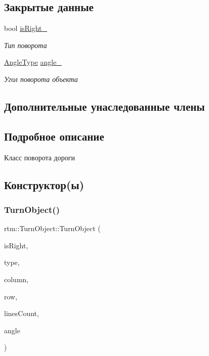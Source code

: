 \subsection*{Закрытые данные}
\begin{DoxyCompactItemize}
\item 
\mbox{\label{classrtm_1_1_turn_object_aae270ae895bdc8edc482e21e1784f042}} 
bool \hyperlink{classrtm_1_1_turn_object_aae270ae895bdc8edc482e21e1784f042}{is\+Right\+\_\+}
\begin{DoxyCompactList}\small\item\em Тип поворота \end{DoxyCompactList}\item 
\mbox{\label{classrtm_1_1_turn_object_afcb2206b9201f0755281dc31fad29e50}} 
\hyperlink{namespacertm_a69dc82b16a0148c10962caa83d930f89}{Angle\+Type} \hyperlink{classrtm_1_1_turn_object_afcb2206b9201f0755281dc31fad29e50}{angle\+\_\+}
\begin{DoxyCompactList}\small\item\em Угол поворота объекта \end{DoxyCompactList}\end{DoxyCompactItemize}
\subsection*{Дополнительные унаследованные члены}


\subsection{Подробное описание}
Класс поворота дороги 

\subsection{Конструктор(ы)}
\mbox{\label{classrtm_1_1_turn_object_ac673c94a34ee6dd7ece82a41fb8f7930}} 
\subsubsection{\texorpdfstring{Turn\+Object()}{TurnObject()}}
{\footnotesize\ttfamily rtm\+::\+Turn\+Object\+::\+Turn\+Object (\begin{DoxyParamCaption}\item[{bool}]{is\+Right,  }\item[{\hyperlink{namespacertm_aecd3929e64cd461eb3555b611f6fad95}{Coating\+Type}}]{type,  }\item[{int}]{column,  }\item[{int}]{row,  }\item[{size\+\_\+t}]{lines\+Count,  }\item[{\hyperlink{namespacertm_a69dc82b16a0148c10962caa83d930f89}{Angle\+Type}}]{angle }\end{DoxyParamCaption})}

